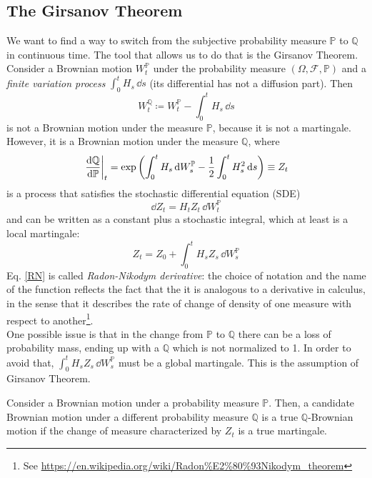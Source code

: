 \subsection{The Girsanov Theorem} %
We want to find a way to switch from the subjective probability measure $\mathbb{P}$ to $\mathbb{Q}$ in continuous time. The tool that allows us to do that is the Girsanov Theorem.\\
Consider a Brownian motion $W_t^{\mathbb{P}}$ under the probability measure $(\Omega, \mathcal{F}, \mathbb{P})$ and a \emph{finite variation process} $\int^t_0 H_s\,\dd s$ (its differential has not a diffusion part). Then
\begin{equation}
    W_t^{\mathbb{Q}} \coloneqq W_t^{\mathbb{P}} - \int^t_0 H_s\,\dd s
\end{equation}
is not a Brownian motion under the measure $\mathbb{P}$, because it is not a martingale. However, it is a Brownian motion under the measure $\mathbb{Q}$, where 
\begin{equation}\label{RN}
    \eval{\dv{\mathbb{Q}}{\mathbb{P}}}_t = \exp\left(\int^t_0 H_s\,\dd W_s^{\mathbb{P}}-\dfrac{1}{2}\int^t_0 H_s^2\,\dd s\right) \equiv Z_t
\end{equation}
is a process that satisfies the stochastic differential equation (SDE)
\begin{equation}
    \dd Z_t = H_t Z_t\,\dd W_t^\mathbb{P}
\end{equation}
and can be written as a constant plus a stochastic integral, which at least is a local martingale:
\begin{equation}
    Z_t = Z_0 + \int_0^t H_s Z_s\,\dd W_s^{\mathbb{P}}
\end{equation}
Eq. \eqref{RN} is called \emph{Radon-Nikodym derivative}: the choice of notation and the name of the function reflects the fact that the it is analogous to a derivative in calculus, in the sense that it describes the rate of change of density of one measure with respect to another\footnote{See \url{https://en.wikipedia.org/wiki/Radon\%E2\%80\%93Nikodym_theorem}}. \\
One possible issue is that in the change from $\mathbb{P}$ to $\mathbb{Q}$ there can be a loss of probability mass, ending up with a $\mathbb{Q}$ which is not normalized to 1. In order to avoid that, $\int_0^t H_s Z_s\,\dd W_s^{\mathbb{P}}$ must be a global martingale. This is the assumption of Girsanov Theorem.
\begin{theorem}
    Consider a Brownian motion under a probability measure $\mathbb{P}$. Then, a candidate Brownian motion under a different probability measure $\mathbb{Q}$ is a true $\mathbb{Q}$-Brownian motion if the change of measure characterized by $Z_t$ is a true martingale.
\end{theorem}

